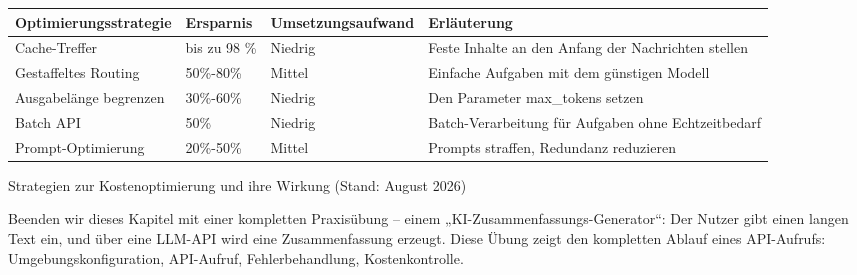 \begin{center}
\begin{tabularx}{\linewidth}{|X|X|X|X|}
\hline
\textbf{Optimierungsstrategie} & \textbf{Ersparnis} & \textbf{Umsetzungsaufwand} & \textbf{Erläuterung} \tabularnewline
\hline
Cache-Treffer & bis zu 98 \% & Niedrig & Feste Inhalte an den Anfang der Nachrichten stellen \tabularnewline
Gestaffeltes Routing & 50\%-80\% & Mittel & Einfache Aufgaben mit dem günstigen Modell \tabularnewline
Ausgabelänge begrenzen & 30\%-60\% & Niedrig & Den Parameter max\_tokens setzen \tabularnewline
Batch API & 50\% & Niedrig & Batch-Verarbeitung für Aufgaben ohne Echtzeitbedarf \tabularnewline
Prompt-Optimierung & 20\%-50\% & Mittel & Prompts straffen, Redundanz reduzieren \tabularnewline
\hline
\end{tabularx}
\end{center}

\begin{center}\small\color{gray}Strategien zur Kostenoptimierung und ihre Wirkung (Stand: August 2026)\end{center}


Beenden wir dieses Kapitel mit einer kompletten Praxisübung – einem „KI-Zusammenfassungs-Generator“: Der Nutzer gibt einen langen Text ein, und über eine LLM-API wird eine Zusammenfassung erzeugt. Diese Übung zeigt den kompletten Ablauf eines API-Aufrufs: Umgebungskonfiguration, API-Aufruf, Fehlerbehandlung, Kostenkontrolle.

